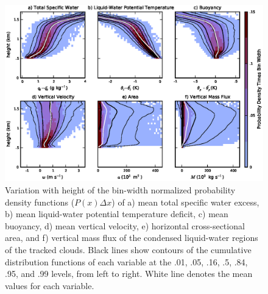 \documentclass[acp]{copernicus}
\begin{document}
\begin{figure}[t]
\vspace*{2mm}
\begin{center}
\includegraphics[width=\textwidth]{./figures/mean_profiles}
\end{center}
\caption{Variation with height of the bin-width normalized probability 
density functions ($P(x) \Delta x$) of a) mean total specific water excess, 
b) mean liquid-water potential temperature deficit, c) mean buoyancy, d) mean 
vertical velocity, e) horizontal cross-sectional area, and f) vertical mass 
flux of the condensed liquid-water regions of the tracked clouds.  Black lines 
show contours of the cumulative distribution functions of each variable at the 
.01, .05, .16, .5, .84, .95, and .99 levels, from left to right.  White line 
denotes the mean values for each variable. }
\label{fig:mean_profiles}
\end{figure}
\end{document}

